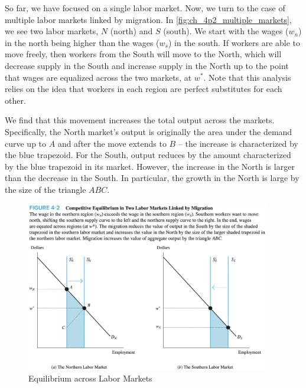 So far, we have focused on a single labor market.
Now, we turn to the case of multiple labor markets
linked by migration.
In \autoref{fig:ch_4p2_multiple_markets},
we see two labor markets, $N$ (north) and $S$ (south).
We start with the wages ($w_n$) in the north being 
higher than the wages ($w_s$) in the south.
If workers are able to move freely, then workers 
from the South will move to the North, which will
decrease supply in the South and increase supply
in the North up to the point that wages are equalized
across the two markets, at $w^*$.
Note that this analysis relies on the idea that workers 
in each region are perfect substitutes for each other.

We find that this movement 
increases the total output across the markets.
Specifically, the North market's 
output is originally the area under the demand curve 
up to $A$ and after the move extends to $B$ -- the 
increase is characterized by the blue trapezoid.
For the South, output reduces by the amount characterized 
by the blue trapezoid in its market. However,
the increase in the North is larger than the decrease
in the South. In particular, the growth in the North
is large by the size of the triangle $ABC$.


\FloatBarrier

\begin{figure}[!htb]
    \centering
        \includegraphics[width=0.95\textwidth]{../input/ch_4p2_multiple_markets.png}
    \caption{Equilibrium across Labor Markets}
    \label{fig:ch_4p2_multiple_markets}
\end{figure}

\FloatBarrier


